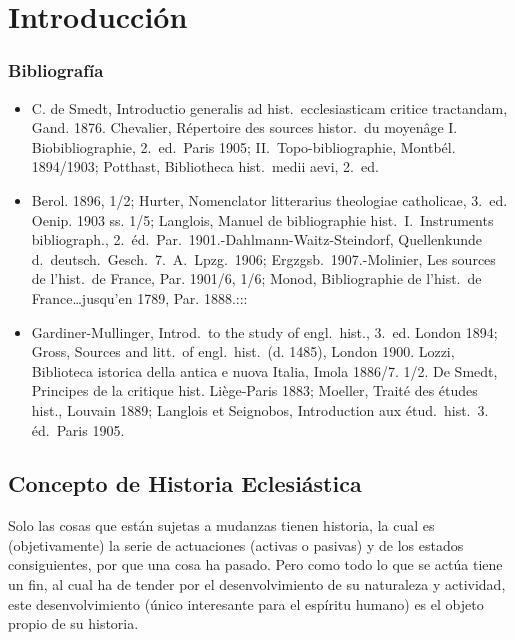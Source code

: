 \raggedbottom{} \documentclass[12pt, a4paper, openany]{book} %
\begin{document}
\chapter{Introducción}
\subsection{Bibliografía}
\begin{itemize}
  \item C. de Smedt, Introductio generalis ad hist.\ ecclesiasticam critice tractandam, Gand. 1876. Chevalier, Répertoire des sources histor.\ du moyenâge I. Biobibliographie, 2.\ ed.\ Paris 1905; II.\ Topo-bibliographie, Montbél. 1894/1903; Potthast, Bibliotheca hist.\ medii aevi, 2.\ ed.\
  \item Berol. 1896, 1/2; Hurter, Nomenclator litterarius theologiae catholicae, 3.\ ed. Oenip. 1903 ss. 1/5; Langlois, Manuel de bibliographie hist.\ I.\ Instruments bibliograph., 2.\ éd.\ Par.\ 1901.-Dahlmann-Waitz-Steindorf, Quellenkunde d.\ deutsch.\ Gesch.\ 7.\ A.\ Lpzg.\ 1906; Ergzgsb.\ 1907.-Molinier, Les sources de l'hist.\ de France, Par. 1901/6, 1/6; Monod, Bibliographie de l'hist.\ de France\ldots jusqu'en 1789, Par. 1888.:::
  \item Gardiner-Mullinger, Introd.\ to the study of engl.\ hist., 3.\ ed. London 1894; Gross, Sources and litt.\ of engl.\ hist.\ (d. 1485), London 1900. Lozzi, Biblioteca istorica della antica e nuova Italia, Imola 1886/7. 1/2. De Smedt, Principes de la critique hist. Liège-Paris 1883; Moeller, Traité des études hist., Louvain 1889; Langlois et Seignobos, Introduction aux étud.\ hist.\ 3. éd.\ Paris 1905.
\end{itemize}
\section{Concepto de Historia Eclesiástica}
Solo las cosas que están sujetas a mudanzas tienen historia, la cual es (objetivamente) la serie de actuaciones (activas o pasivas) y de los estados consiguientes, por que una cosa ha pasado. Pero como todo lo que se actúa tiene un fin, al cual ha de tender por el desenvolvimiento de su naturaleza y actividad, este desenvolvimiento (único interesante para el espíritu humano) es el objeto propio de su historia.
\end{document}
